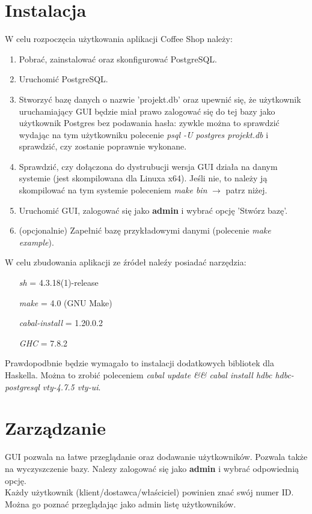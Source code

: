\section{Instalacja}
W celu rozpoczęcia użytkowania aplikacji Coffee Shop należy:\begin{enumerate}
  \item Pobrać, zainstalować oraz skonfigurować PostgreSQL. 
  \item Uruchomić PostgreSQL.
  \item Stworzyć bazę danych o nazwie 'projekt.db' oraz upewnić się, że użytkownik uruchamiający GUI będzie miał prawo zalogować się do tej bazy jako użytkownik Postgres bez podawania hasła: zywkle można to sprawdzić wydając na tym użytkowniku polecenie \textit{psql -U postgres projekt.db} i sprawdzić, czy zostanie poprawnie wykonane.
  \item Sprawdzić, czy dołączona do dystrubucji wersja GUI działa na danym systemie (jest skompilowana dla Linuxa x64). Jeśli nie, to należy ją skompilować na tym systemie poleceniem \textit{make bin} $\rightarrow$  patrz niżej.
  \item Uruchomić GUI, zalogować się jako \textbf{admin} i wybrać opcję 'Stwórz bazę'.
  \item (opcjonalnie) Zapełnić bazę przykładowymi danymi (polecenie \textit{make example}).
\end{enumerate}
W celu zbudowania aplikacji ze źródeł naleźy posiadać narzędzia:\begin{itemize}
  \item[\textit{sh}] = 4.3.18(1)-release
  \item[\textit{make}] = 4.0 (GNU Make)
  \item[\textit{cabal-install}] = 1.20.0.2
  \item[\textit{GHC}] = 7.8.2
\end{itemize}
Prawdopodbnie będzie wymagało to instalacji dodatkowych bibliotek dla Haskella. Można to zrobić poleceniem \textit{cabal update \&\& cabal install hdbc hdbc-postgresql vty-4.7.5 vty-ui}.
\section{Zarządzanie}
GUI pozwala na łatwe przeglądanie oraz dodawanie użytkowników. Pozwala także na wyczyszczenie bazy. Nalezy zalogować się jako \textbf{admin} i wybrać odpowiednią opcję. \\
Każdy użytkownik (klient/dostawca/właściciel) powinien znać swój numer ID. Można go poznać przeglądając jako admin listę użytkowników.

